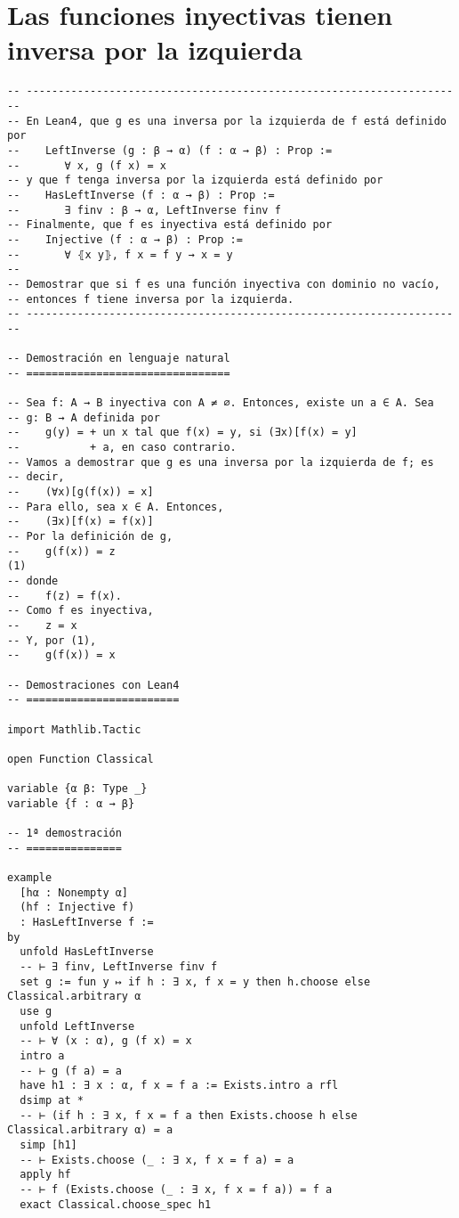 \section{Las funciones inyectivas tienen inversa por la izquierda}
\label{sec:org434b6c3}
\begin{verbatim}
-- ---------------------------------------------------------------------
-- En Lean4, que g es una inversa por la izquierda de f está definido por
--    LeftInverse (g : β → α) (f : α → β) : Prop :=
--       ∀ x, g (f x) = x
-- y que f tenga inversa por la izquierda está definido por
--    HasLeftInverse (f : α → β) : Prop :=
--       ∃ finv : β → α, LeftInverse finv f
-- Finalmente, que f es inyectiva está definido por
--    Injective (f : α → β) : Prop :=
--       ∀ ⦃x y⦄, f x = f y → x = y
--
-- Demostrar que si f es una función inyectiva con dominio no vacío,
-- entonces f tiene inversa por la izquierda.
-- ---------------------------------------------------------------------

-- Demostración en lenguaje natural
-- ================================

-- Sea f: A → B inyectiva con A ≠ ∅. Entonces, existe un a ∈ A. Sea
-- g: B → A definida por
--    g(y) = + un x tal que f(x) = y, si (∃x)[f(x) = y]
--           + a, en caso contrario.
-- Vamos a demostrar que g es una inversa por la izquierda de f; es
-- decir,
--    (∀x)[g(f(x)) = x]
-- Para ello, sea x ∈ A. Entonces,
--    (∃x)[f(x) = f(x)]
-- Por la definición de g,
--    g(f(x)) = z                                                    (1)
-- donde
--    f(z) = f(x).
-- Como f es inyectiva,
--    z = x
-- Y, por (1),
--    g(f(x)) = x

-- Demostraciones con Lean4
-- ========================

import Mathlib.Tactic

open Function Classical

variable {α β: Type _}
variable {f : α → β}

-- 1ª demostración
-- ===============

example
  [hα : Nonempty α]
  (hf : Injective f)
  : HasLeftInverse f :=
by
  unfold HasLeftInverse
  -- ⊢ ∃ finv, LeftInverse finv f
  set g := fun y ↦ if h : ∃ x, f x = y then h.choose else Classical.arbitrary α
  use g
  unfold LeftInverse
  -- ⊢ ∀ (x : α), g (f x) = x
  intro a
  -- ⊢ g (f a) = a
  have h1 : ∃ x : α, f x = f a := Exists.intro a rfl
  dsimp at *
  -- ⊢ (if h : ∃ x, f x = f a then Exists.choose h else Classical.arbitrary α) = a
  simp [h1]
  -- ⊢ Exists.choose (_ : ∃ x, f x = f a) = a
  apply hf
  -- ⊢ f (Exists.choose (_ : ∃ x, f x = f a)) = f a
  exact Classical.choose_spec h1


\end{verbatim}
